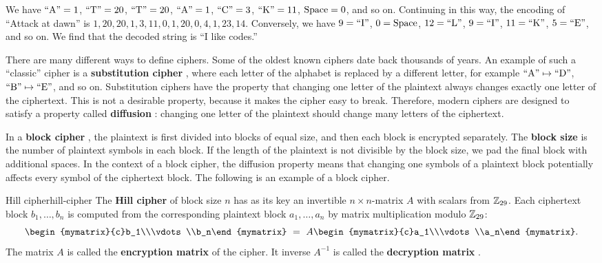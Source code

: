 \begin{solution}
  We have $\mbox{``A''}=1$, $\mbox{``T''}=20$, $\mbox{``T''}=20$, $\mbox{``A''}=1$, $\mbox{``C''}=3$,
  $\mbox{``K''}=11$, $\mbox{Space}=0$, and so on. Continuing in this way, the
  encoding of ``Attack at dawn'' is
  $1,20,20,1,3,11,0,1,20,0,4,1,23,14$.  Conversely, we have $9=\mbox{``I''}$,
  $0=\mbox{Space}$, $12=\mbox{``L''}$, $9=\mbox{``I''}$, $11=\mbox{``K''}$, $5=\mbox{``E''}$, and so
  on. We find that the decoded string is ``I like codes.''
\end{solution}

There are many different ways to define ciphers. Some of the oldest
known ciphers date back thousands of years.  An example of such a
``classic'' cipher is a \textbf{substitution cipher}%
, where
each letter of the alphabet is replaced by a different letter, for
example $\mbox{``A''}\mapsto\mbox{``D''}$, $\mbox{``B''}\mapsto\mbox{``E''}$, and so
on. Substitution ciphers have the property that changing one letter of
the plaintext always changes exactly one letter of the
ciphertext. This is not a desirable property, because it makes the
cipher easy to break. Therefore, modern ciphers are designed to
satisfy a property called \textbf{diffusion}%
: changing one letter of the plaintext should
change many letters of the ciphertext.

In a \textbf{block cipher}%
, the plaintext is
first divided into blocks of equal size, and then each block is
encrypted separately. The \textbf{block size} is the
number of plaintext symbols in each block. If the length of the
plaintext is not divisible by the block size, we pad the final block
with additional spaces. In the context of a block cipher, the
diffusion property means that changing one symbols of a plaintext
block potentially affects every symbol of the ciphertext block. The
following is an example of a block cipher.

\begin{definition}{Hill cipher}{hill-cipher}
  The \textbf{Hill cipher}%
   of block size $n$ has
  as its key an invertible $n\times n$-matrix $A$ with scalars from
  $\mathbb{Z}_{29}$. Each ciphertext block $b_1,\ldots,b_n$  is computed from
  the corresponding plaintext block $a_1,\ldots,a_n$ by matrix
  multiplication modulo $\mathbb{Z}_{29}$:
  \begin{equation*}
    \begin{mymatrix}{c}b_1\\\vdots\\b_n\end{mymatrix}
    ~=~ A\begin{mymatrix}{c}a_1\\\vdots\\a_n\end{mymatrix}.
  \end{equation*}
  The matrix $A$ is called the \textbf{encryption matrix}%
   of the cipher. It
  inverse $A^{-1}$ is called the \textbf{decryption matrix}%
  .
\end{definition}

